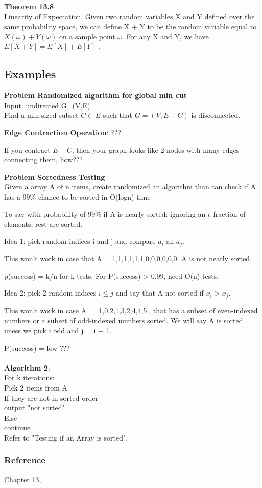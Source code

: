 \documentclass[12pt,article]{article}
\newcommand\tab[1][1cm]{\hspace*{#1}}
\newenvironment{problem}[2][Problem]
    { \begin{mdframed}[backgroundcolor=gray!20] \textbf{#1 #2} \\}
    {  \end{mdframed}}
\newenvironment{theorem}[2][Theorem]
    { \begin{mdframed}[backgroundcolor=blue!10] \textbf{#1 #2} \\}
    {  \end{mdframed}}
\begin{document}
\begin{theorem}{13.8}
Linearity of Expectation. Given two random variables X and Y defined
over the same probability space, we can define X + Y to be the random variable
equal to $X(\omega) + Y(\omega)$ on a sample point $\omega$. For any X and Y, we have $E [X + Y]= E [X]+ E [Y]$ \cite{kleinbergalgorithm}.
\end{theorem}

\subsection{Examples}

\begin{problem}{Randomized algorithm for global min cut} 
Input: undirected G=(V,E)\\
Find a min sized subset $C \subset E$ such that $G = (V,E - C)$ is disconnected.
\end{problem}

\textbf{Edge Contraction Operation}: ???

If you contract $E - C$, then your graph looks like 2 nodes with many edges connecting them, how???

\begin{problem}{Sortedness Testing} 
Given a array A of n items, create randomized an algorithm than can check if A has a 99\% chance to be sorted in O(logn) time
\end{problem}

To say with probability of 99\% if A is nearly sorted: ignoring an $\epsilon$ fraction of elements, rest are sorted.

Idea 1: pick random indices i and j and compare $a_i$ an $a_j$.

This won't work in case that A = 1,1,1,1,1,1,0,0,0,0,0,0. A is not nearly sorted.

p(success) = k/n for k tests. For P(success) > 0.99, need O(n) tests.

Idea 2: pick 2 random indices $i \leq j$ and say that A not sorted if $x_i > x_j$.

This won't work in case A = [1,0,2,1,3,2,4,4,5], that has a subset of even-indexed numbers or a subset of odd-indexed numbers sorted. We will say A is sorted uness we pick i odd and j = i + 1.

P(success) = low ???
\\
\\
\textbf{Algorithm 2}: \\
For k iterations: \\
\tab[1cm] Pick 2 items from A \\
\tab[1cm] If they are not in sorted order \\
\tab[1cm]   output "not sorted" \\
\tab[1cm] Else \\ 
\tab[1cm]   continue \\ 

Refer to "Testing if an Array is sorted".


\subsubsection{Reference}
Chapter 13, \cite{kleinbergalgorithm}

\newpage


\end{document}
